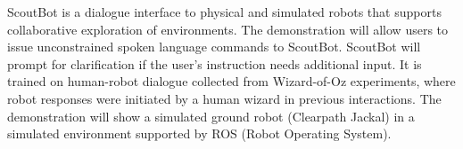 ScoutBot is a dialogue interface to physical and simulated robots that supports collaborative exploration of environments. The demonstration will allow users to issue unconstrained spoken language commands to ScoutBot. ScoutBot will prompt for clarification if the user's instruction needs additional input. It is trained on human-robot dialogue collected from Wizard-of-Oz experiments, where robot responses were initiated by a human wizard in previous interactions. The demonstration will show a simulated ground robot (Clearpath Jackal) in a simulated environment supported by ROS (Robot Operating System).
